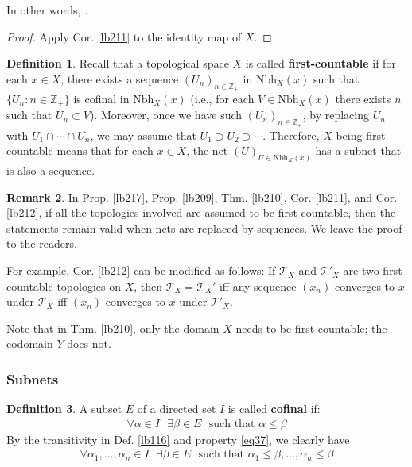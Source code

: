 \documentclass[12pt,b5paper,notitlepage]{article}
\theoremstyle{definition}
\newtheorem{df}{Definition}[subsection]
\newtheorem{rem}[df]{Remark}
\theoremstyle{plain}
\newcommand{\Zbb}{\mathbb Z}
\newcommand{\Nbh}{\mathrm{Nbh}}
\newcommand{\MT}{\mathcal T}
\newcommand{\hqed}{\hfill\qedsymbol}
\numberwithin{equation}{section}
\begin{document}
In other words, .


\begin{proof}
Apply Cor. \ref{lb211} to the identity map of $X$.
\end{proof}

\begin{df}
Recall that a topological space $X$ is called \textbf{first-countable}  if for each $x\in X$, there exists a sequence $(U_n)_{n\in\Zbb_+}$ in $\Nbh_X(x)$ such that $\{U_n:n\in\Zbb_+\}$ is cofinal in $\Nbh_X(x)$ (i.e., for each $V\in\Nbh_X(x)$ there exists $n$ such that $U_n\subset V$). Moreover, once we have such $(U_n)_{n\in\Zbb_+}$, by replacing $U_n$ with $U_1\cap\cdots\cap U_n$, we may assume that $U_1\supset U_2\supset\cdots$. Therefore, $X$ being first-countable means that for each $x\in X$, the net $(U)_{U\in\Nbh_X(x)}$ has a subnet that is also a sequence.
\end{df}


\begin{rem}\label{lb221}
In Prop. \ref{lb217}, Prop. \ref{lb209}, Thm. \ref{lb210}, Cor. \ref{lb211}, and Cor. \ref{lb212}, if all the topologies involved are assumed to be first-countable, then the statements remain valid when nets are replaced by sequences. We leave the proof to the readers. 

For example, Cor. \ref{lb212} can be modified as follows: If $\MT_X$ and $\MT'_X$ are two first-countable topologies on $X$, then $\MT_X=\MT_X'$ iff any sequence $(x_n)$ converges to $x$ under $\MT_X$ iff $(x_n)$ converges to $x$ under $\MT'_X$.


Note that in Thm. \ref{lb210}, only the domain $X$ needs to be first-countable; the codomain $Y$ does not. \hqed
\end{rem}



\subsubsection{Subnets}

\begin{df}
A subset $E$ of a directed set $I$ is called \textbf{cofinal}  if:
\begin{align*}
\forall\alpha\in I~~~\exists\beta\in E~~~\text{such that }\alpha\leq\beta
\end{align*}
By the transitivity in Def. \ref{lb116} and property \eqref{eq37}, we clearly have
\begin{align*}
\forall\alpha_1,\dots,\alpha_n\in I~~~\exists\beta\in E~~~\text{such that }\alpha_1\leq\beta,\dots,\alpha_n\leq\beta
\end{align*}
\end{df}
\end{document}
